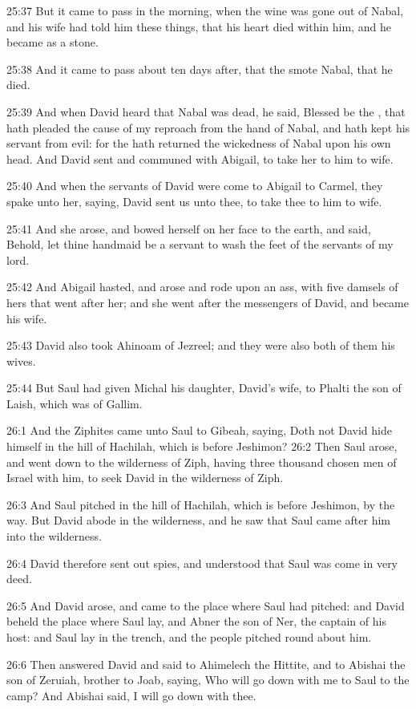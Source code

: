 25:37 But it came to pass in the morning, when the wine was gone out
of Nabal, and his wife had told him these things, that his heart died
within him, and he became as a stone.

25:38 And it came to pass about ten days after, that the \LORD smote
Nabal, that he died.

25:39 And when David heard that Nabal was dead, he said, Blessed be
the \LORD, that hath pleaded the cause of my reproach from the hand of
Nabal, and hath kept his servant from evil: for the \LORD hath returned
the wickedness of Nabal upon his own head. And David sent and communed
with Abigail, to take her to him to wife.

25:40 And when the servants of David were come to Abigail to Carmel,
they spake unto her, saying, David sent us unto thee, to take thee to
him to wife.

25:41 And she arose, and bowed herself on her face to the earth, and
said, Behold, let thine handmaid be a servant to wash the feet of the
servants of my lord.

25:42 And Abigail hasted, and arose and rode upon an ass, with five
damsels of hers that went after her; and she went after the messengers
of David, and became his wife.

25:43 David also took Ahinoam of Jezreel; and they were also both of
them his wives.

25:44 But Saul had given Michal his daughter, David's wife, to Phalti
the son of Laish, which was of Gallim.

26:1 And the Ziphites came unto Saul to Gibeah, saying, Doth not David
hide himself in the hill of Hachilah, which is before Jeshimon?  26:2
Then Saul arose, and went down to the wilderness of Ziph, having three
thousand chosen men of Israel with him, to seek David in the
wilderness of Ziph.

26:3 And Saul pitched in the hill of Hachilah, which is before
Jeshimon, by the way. But David abode in the wilderness, and he saw
that Saul came after him into the wilderness.

26:4 David therefore sent out spies, and understood that Saul was come
in very deed.

26:5 And David arose, and came to the place where Saul had pitched:
and David beheld the place where Saul lay, and Abner the son of Ner,
the captain of his host: and Saul lay in the trench, and the people
pitched round about him.

26:6 Then answered David and said to Ahimelech the Hittite, and to
Abishai the son of Zeruiah, brother to Joab, saying, Who will go down
with me to Saul to the camp? And Abishai said, I will go down with
thee.

